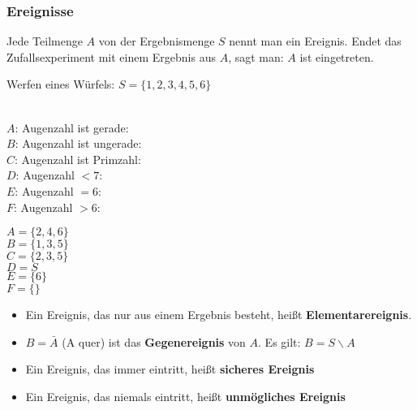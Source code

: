 \documentclass[../MAIN/main.tex]{subfiles}
\begin{document}
\subsubsection{Ereignisse}
\begin{Definition}[- Ereignisse]
  Jede Teilmenge $A$ von der Ergebnismenge $S$ nennt man ein Ereignis. Endet das Zufallsexperiment mit einem Ergebnis aus $A$, sagt man: $A$ ist eingetreten.
\end{Definition}
\begin{Beispiel}
  Werfen eines Würfels: $S = \{ 1,2,3,4,5,6 \}$\\\\
  \begin{minipage}{0.4\textwidth}
    $A$: Augenzahl ist gerade:\\
    $B$: Augenzahl ist ungerade:\\
    $C$: Augenzahl ist Primzahl:\\
    $D$: Augenzahl $<7$:\\
    $E$: Augenzahl $=6$:\\
    $F$: Augenzahl $>6$:\\
  \end{minipage}
  \begin{minipage}{0.6\textwidth}
    $A = \{ 2,4,6 \}$\\
    $B = \{ 1,3,5 \}$\\
    $C = \{ 2,3,5 \}$\\
    $D =S$\\
    $E = \{ 6 \}$\\
    $F = \{ \}$
  \end{minipage}
\end{Beispiel}
\begin{Bemerkung}
  \begin{Definition}
    \begin{itemize}
      \item Ein Ereignis, das nur aus einem Ergebnis besteht, heißt \textbf{Elementarereignis}.
      \item $B=\bar A$ (A quer) ist das \textbf{Gegenereignis} von $A$. Es gilt: $B = S \backslash A$
      \item Ein Ereignis, das immer eintritt, heißt \textbf{sicheres Ereignis}
      \item Ein Ereignis, das niemals eintritt, heißt \textbf{unmögliches Ereignis}
    \end{itemize}
  \end{Definition}
\end{Bemerkung}
\end{document}
